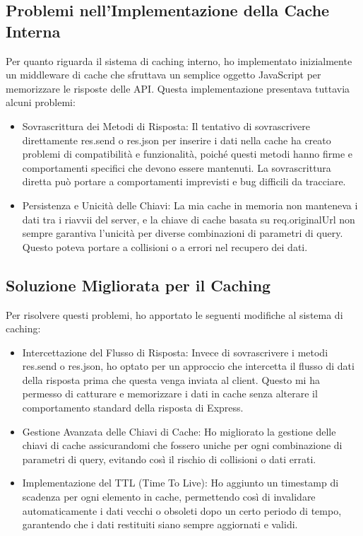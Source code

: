 \documentclass[12pt]{article}
\begin{document}
\subsection{Problemi nell'Implementazione della Cache Interna}
Per quanto riguarda il sistema di caching interno, ho implementato inizialmente un middleware di cache che sfruttava un semplice oggetto JavaScript per memorizzare le risposte delle API. Questa implementazione presentava tuttavia alcuni problemi:

\begin{itemize}
\item Sovrascrittura dei Metodi di Risposta: Il tentativo di sovrascrivere direttamente res.send o res.json per inserire i dati nella cache ha creato problemi di compatibilità e funzionalità, poiché questi metodi hanno firme e comportamenti specifici che devono essere mantenuti. La sovrascrittura diretta può portare a comportamenti imprevisti e bug difficili da tracciare.
\item Persistenza e Unicità delle Chiavi: La mia cache in memoria non manteneva i dati tra i riavvii del server, e la chiave di cache basata su req.originalUrl non sempre garantiva l'unicità per diverse combinazioni di parametri di query. Questo poteva portare a collisioni o a errori nel recupero dei dati.
\end{itemize}

\subsection{Soluzione Migliorata per il Caching}

Per risolvere questi problemi, ho apportato le seguenti modifiche al sistema di caching:
\begin{itemize}
\item Intercettazione del Flusso di Risposta: Invece di sovrascrivere i metodi res.send o res.json, ho optato per un approccio che intercetta il flusso di dati della risposta prima che questa venga inviata al client. Questo mi ha permesso di catturare e memorizzare i dati in cache senza alterare il comportamento standard della risposta di Express.
\item Gestione Avanzata delle Chiavi di Cache: Ho migliorato la gestione delle chiavi di cache assicurandomi che fossero uniche per ogni combinazione di parametri di query, evitando così il rischio di collisioni o dati errati.
\item Implementazione del TTL (Time To Live): Ho aggiunto un timestamp di scadenza per ogni elemento in cache, permettendo così di invalidare automaticamente i dati vecchi o obsoleti dopo un certo periodo di tempo, garantendo che i dati restituiti siano sempre aggiornati e validi.
\end{itemize}
\end{document}
